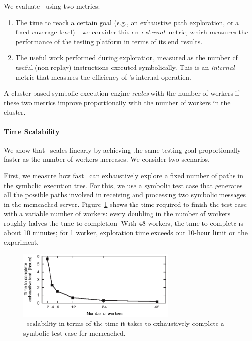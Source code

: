 We evaluate \cnine\ using two metrics:
\begin{enumerate}
\item The time to reach a certain goal (e.g., an exhaustive path exploration, or a fixed coverage level)---we consider this an \emph{external} metric, which measures the performance of the testing platform in terms of its end results.
\item The useful work performed during exploration, measured as the number of useful (non-replay) instructions executed symbolically. This is an \emph{internal} metric that measures the efficiency of \cnine's internal operation. 
\end{enumerate}

A cluster-based symbolic execution engine \emph{scales} with the number of workers if these two metrics improve proportionally with the number of workers in the cluster.

\paragraph{Time Scalability} We show that \cnine\ scales linearly by achieving the same testing goal proportionally faster as the number of workers increases. We consider two scenarios.

First, we measure how fast \cnine\ can exhaustively explore a fixed number of paths in the symbolic execution tree.  For this, we use a symbolic test case that generates all the possible paths involved in receiving and processing two symbolic messages in the memcached server.  Figure~\ref{fig:scalab-time-vs-workers} shows the time required to finish the test case with a variable number of workers: every doubling in the number of workers roughly halves the time to completion.  With 48 workers, the time to complete is about 10 minutes; for 1 worker,  exploration time exceeds our 10-hour limit on the experiment.  


\begin{figure}
  \centering
  \includegraphics[width=0.7\textwidth]{evaluation/graphs/cloud9/scalab-time-vs-workers-edited}
  \caption{\cnine\ scalability in terms of the time it takes to exhaustively complete a symbolic test case for memcached.}
  \label{fig:scalab-time-vs-workers}
\end{figure}

